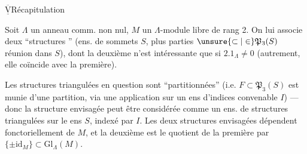  
$\overline{\underline{\mathrm V}}$\quad Récapitulation

Soit $\Lambda$ un anneau comm. non nul, $M$ un $\Lambda$-module libre de rang 2. On lui associe deux ``structures '' (ens. de sommets $S$, plus   parties   $\unsure{\subset|\in}\mathfrak P_3(S)$   réunion dans $S$), dont la deuxième n'est intéressante que si $2.1_\Lambda\ne0$ (autrement, elle coïncide avec la première).

Les structures triangulées  en question sont ``partitionnées'' (i.e. $F\subset\mathfrak P_3(S)$ est munie d'une partition, via une application sur un ens d'indices convenable $I$) --- donc la structure envisagée peut être considérée comme un ens. de structures triangulées sur le  ens $S$, indexé par $I$. Les deux structures envisagées dépendent fonctoriellement de $M$, et la deuxième est le quotient de la première par $\{\pm\mathrm{id}_M\}\subset\mathrm{Gl}_\Lambda(M)$.

